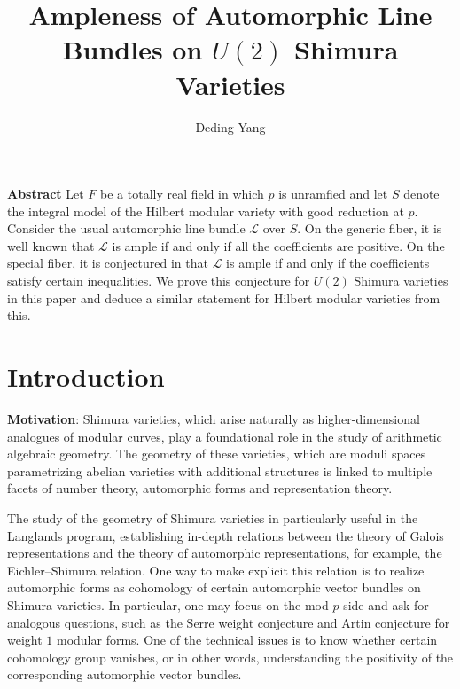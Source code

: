 \documentclass{article}
\title{\huge Ampleness of Automorphic Line Bundles on $U(2)$ Shimura Varieties}
\author{\Large Deding Yang}
\begin{document}
\setcounter{counter}{1}
\newtheorem{lemma}{Lemma}
\newtheorem{proposition}[lemma]{Proposition}
\newtheorem{theorem}[lemma]{Theorem}
\newtheorem{definition}[lemma]{Definition}
\newtheorem{remark}[lemma]{Remark}
\newtheorem{example}[lemma]{Example}
\newtheorem{assumption}[lemma]{Assumption}
\newtheorem{notation}[lemma]{Notation}




\maketitle

\medskip

\noindent\textbf{Abstract} Let $F$ be a totally real field in which $p$ is unramfied and let $S$ denote the integral model of the Hilbert modular variety with good reduction at $p$. Consider the usual automorphic line bundle $\mathcal{L}$ over $S$.  On the generic fiber, it is well known that $\mathcal{L}$ is ample if and only if all the coefficients are positive. On the special fiber, it is conjectured in \citep{Tian-Xiao} that $\mathcal{L}$ is ample if and only if the coefficients satisfy certain inequalities. We prove this conjecture for $U(2)$ Shimura varieties in this paper and deduce a similar statement for Hilbert modular varieties from this.



\tableofcontents





\section{Introduction}

\medskip
\noindent \textbf{Motivation}: 
Shimura varieties, which arise naturally as higher-dimensional analogues of modular curves, play a foundational role in the study of arithmetic algebraic geometry. The geometry of these varieties, which are moduli spaces parametrizing abelian varieties with additional structures is linked to multiple facets of number theory, automorphic forms and representation theory.

The study of the geometry of Shimura varieties in particularly useful in the Langlands program, establishing in-depth relations between the theory of Galois representations and the theory of automorphic representations, for example, the Eichler--Shimura relation. One way to make explicit this relation is to realize automorphic forms as cohomology of certain automorphic vector bundles on Shimura varieties. In particular, one may focus on the mod $p$ side and ask for analogous questions, such as the Serre weight conjecture and Artin conjecture for weight $1$ modular forms. One of the technical issues is to know whether certain cohomology group vanishes, or in other words, understanding the positivity of the corresponding automorphic vector bundles. 
\end{document}
